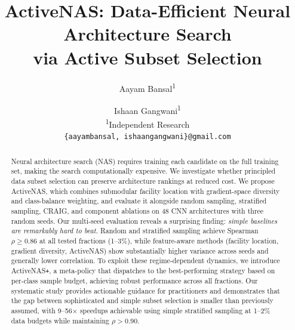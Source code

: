 \documentclass{cvpr}
\newcommand{\method}{ActiveNAS}
\newcommand{\methodplus}{ActiveNAS\texttt{+}}
\newcommand{\spearman}{\rho}
\begin{document}
\title{ActiveNAS: Data-Efficient Neural Architecture Search\\via Active Subset Selection}

\author{Aayam Bansal\textsuperscript{1} \and Ishaan Gangwani\textsuperscript{1}\\
\textsuperscript{1}Independent Research\\
{\tt\small \{aayambansal, ishaangangwani\}@gmail.com}}

\maketitle

\begin{abstract}
Neural architecture search (NAS) requires training each candidate on the full training set, making the search computationally expensive. We investigate whether principled data subset selection can preserve architecture rankings at reduced cost. We propose \method{}, which combines submodular facility location with gradient-space diversity and class-balance weighting, and evaluate it alongside random sampling, stratified sampling, CRAIG, and component ablations on 48 CNN architectures with three random seeds. Our multi-seed evaluation reveals a surprising finding: \emph{simple baselines are remarkably hard to beat}. Random and stratified sampling achieve Spearman $\spearman \geq 0.86$ at all tested fractions (1--3\%), while feature-aware methods (facility location, gradient diversity, \method{}) show substantially higher variance across seeds and generally lower correlation. To exploit these regime-dependent dynamics, we introduce \methodplus{}, a meta-policy that dispatches to the best-performing strategy based on per-class sample budget, achieving robust performance across all fractions. Our systematic study provides actionable guidance for practitioners and demonstrates that the gap between sophisticated and simple subset selection is smaller than previously assumed, with 9--56$\times$ speedups achievable using simple stratified sampling at 1--2\% data budgets while maintaining $\spearman > 0.90$.
\end{abstract}

\end{document}
